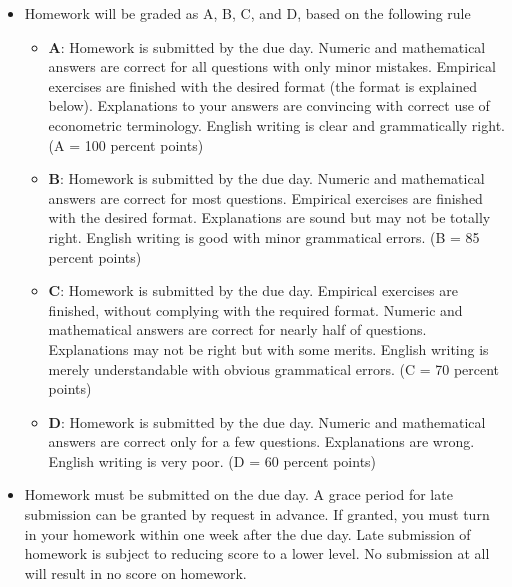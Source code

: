 \documentclass[a4paper,11pt]{article}
\begin{document}
\begin{itemize}
\item Homework will be graded as A, B, C, and D, based on the following
rule
\begin{itemize}
\item \textbf{A}: Homework is submitted by the due day. Numeric and mathematical
answers are correct for all questions with only minor
mistakes. Empirical exercises are finished with the desired
format (the format is explained below). Explanations to your
answers are convincing with correct use of econometric
terminology. English writing is clear and grammatically right. (A
= 100 percent points)
\item \textbf{B}: Homework is submitted by the due day. Numeric and
mathematical answers are correct for most questions. Empirical
exercises are finished with the desired format. Explanations are
sound but may not be totally right. English writing is good with
minor grammatical errors. (B = 85 percent points)
\item \textbf{C}: Homework is submitted by the due day. Empirical exercises
are finished, without complying with the required format. Numeric
and mathematical answers are correct for nearly half of
questions. Explanations may not be right but with some
merits. English writing is merely understandable with obvious
grammatical errors. (C = 70 percent points)
\item \textbf{D}: Homework is submitted by the due day. Numeric and
mathematical answers are correct only for a few
questions. Explanations are wrong. English writing is very
poor. (D = 60 percent points)
\end{itemize}

\item Homework must be submitted on the due day. A grace period for late
submission can be granted by request in advance. If granted, you
must turn in your homework within one week after the due day. Late
submission of homework is subject to reducing score to a lower
level. No submission at all will result in no score on homework.
\end{itemize}
\end{document}
